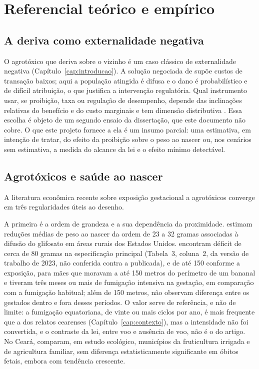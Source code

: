 
\chapter{Referencial teórico e empírico}
\label{cap:referencial}

\section{A deriva como externalidade negativa}

O agrotóxico que deriva sobre o vizinho é um caso clássico de externalidade
negativa (Capítulo~\ref{cap:introducao}). A solução negociada de  supõe custos de
transação baixos; aqui a população atingida é difusa e o dano é
probabilístico e de difícil atribuição, o que justifica a intervenção
regulatória. Qual instrumento usar, se proibição, taxa ou regulação de
desempenho, depende das inclinações relativas do benefício e do custo
marginais \cite{weitzman1974} e tem dimensão distributiva
\cite{lichtenberg1988,helfand1995}. Essa escolha é objeto de um
segundo ensaio da dissertação, que este documento não cobre. O que este
projeto fornece a ela é um insumo parcial: uma estimativa, em intenção de
tratar, do efeito da proibição sobre o peso ao nascer ou, nos cenários sem
estimativa, a medida do alcance da lei e o efeito mínimo detectável.

\section{Agrotóxicos e saúde ao nascer}

A literatura econômica recente sobre exposição gestacional a agrotóxicos
converge em três regularidades úteis ao desenho.

A primeira é a ordem de grandeza e a sua dependência da proximidade.
 estimam reduções médias de peso ao nascer da
ordem de 23 a 32 gramas associadas à difusão do glifosato em áreas rurais dos
Estados Unidos.  encontram déficit de cerca de
80 gramas na especificação principal (Tabela~3, coluna~2, da versão de
trabalho de 2023, não conferida contra a publicada), e de até 150 conforme a exposição, para mães que moravam a até 150
metros do perímetro de um bananal e tiveram três meses ou mais de fumigação
intensiva na gestação, em comparação com a fumigação habitual; além de 150
metros, não observam diferença entre os gestados dentro e fora desses períodos.
O valor serve de referência, e não de limite: a fumigação equatoriana, de vinte
ou mais ciclos por ano, é mais frequente que a dos relatos cearenses
(Capítulo~\ref{cap:contexto}), mas a intensidade não foi convertida, e o
contraste da lei, entre voo e ausência de voo, não é o do artigo. No Ceará,
 comparam, em estudo ecológico, municípios da
fruticultura irrigada e de agricultura familiar, sem diferença
estatisticamente significante em óbitos fetais, embora com tendência crescente.

